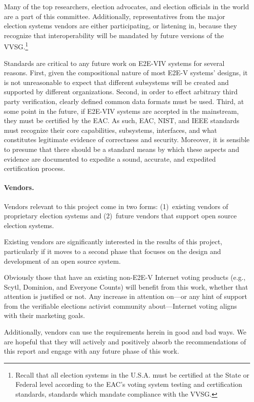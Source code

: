 Many of the top researchers, election advocates, and election
officials in the world are a part of this committee. Additionally,
representatives from the major election systems vendors are either
participating, or listening in, because they recognize that
interoperability will be mandated by future versions of the
VVSG.\footnote{Recall that all election systems in the U.S.A. must be
  certified at the State or Federal level according to the EAC's
  voting system testing and certification standards, standards which
  mandate compliance with the VVSG.}

Standards are critical to any future work on E2E-VIV systems for
several reasons. First, given the compositional nature of most E2E-V
systems' designs, it is not unreasonable to expect that different
subsystems will be created and supported by different organizations.
Second, in order to effect arbitrary third party verification, clearly
defined common data formats must be used. Third, at some point in the
future, if E2E-VIV systems are accepted in the mainstream, they must
be certified by the EAC. As such, EAC, NIST, and IEEE standards must
recognize their core capabilities, subsystems, interfaces, and what
constitutes legitimate evidence of correctness and security. Moreover,
it is sensible to presume that there should be a standard means by
which these aspects and evidence are documented to expedite a sound,
accurate, and expedited certification process.

\paragraph{Vendors.} Vendors relevant to this project come in two
forms: (1)~existing vendors of proprietary election systems and
(2)~future vendors that support open source election systems.

Existing vendors are significantly interested in the results of this
project, particularly if it moves to a second phase that focuses on
the design and development of an open source system.

Obviously those that have an existing non-E2E-V Internet voting
products (e.g., Scytl, Dominion, and Everyone Counts) will benefit from
this work, whether that attention is justified or not. Any increase in
attention on---or any hint of support from the verifiable elections
activist community about---Internet voting aligns with their marketing
goals.

Additionally, vendors can use the requirements herein in good and bad
ways. We are hopeful that they will actively and positively absorb the
recommendations of this report and engage with any future phase of
this work.

